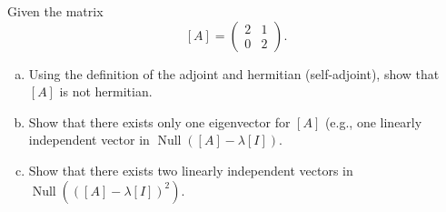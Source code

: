\documentclass[12pt]{article} %
\begin{document}
\newpage
\begin{problem}
Given the matrix
\[
[A] = \begin{pmatrix} 2 & 1 \\ 0 & 2 \end{pmatrix}.
\]
\begin{enumerate}[(a)]
    \item Using the definition of the adjoint and hermitian (self-adjoint), show that $[A]$ is not hermitian.
    \item Show that there exists only one eigenvector for $[A]$ (e.g., one linearly independent vector in $\operatorname{Null}([A]-\lambda[I])$.
    \item Show that there exists two linearly independent vectors in $\operatorname{Null}(([A]-\lambda [I])^2)$. 
\end{enumerate}
\end{problem}
\end{document}
